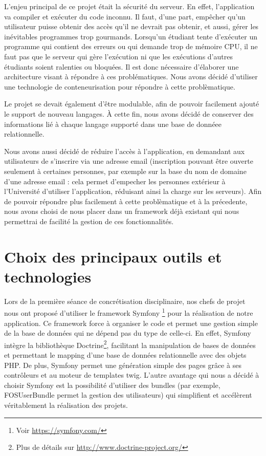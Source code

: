 \par L'enjeu principal de ce projet était la sécurité du serveur. En effet, l'application va compiler et exécuter du code inconnu. Il faut, d'une part, empêcher qu'un utilisateur puisse obtenir des accès qu'il ne devrait pas obtenir, et aussi, gérer les inévitables programmes trop gourmands. Lorsqu'un étudiant tente d'exécuter un programme qui contient des erreurs ou qui demande trop de mémoire CPU, il ne faut pas que le serveur qui gère l'exécution ni que les exécutions d'autres étudiants soient ralenties ou bloquées. Il est donc nécessaire d'élaborer une architecture visant à répondre à ces problématiques. Nous avons décidé d'utiliser une technologie de conteneurisation pour répondre à cette problèmatique.

\par Le projet se devait également d'être modulable, afin de pouvoir facilement ajouté le support de nouveau langages. À cette fin, nous avons décidé de conserver des informations lié à chaque langage supporté dans une base de donnéee relationnelle.

\par Nous avons aussi décidé de réduire l'accès à l'application, en demandant aux utilisateurs de s'inscrire via une adresse email (inscription pouvant être ouverte seulement à certaines personnes, par exemple sur la base du nom de domaine d'une adresse email : cela permet d'empecher les personnes extérieur à l'Université d'utiliser l'application, réduisant ainsi la charge sur les serveurs). Afin de pouvoir répondre plus facilement à cette problèmatique et à la précedente, nous avons choisi de nous placer dans un framework déjà existant qui nous permettrai de facilité la gestion de ces fonctionnalités.

\section{Choix des principaux outils et technologies}
\label{sec-principaux-outils}
\par Lors de la première séance de concrétisation disciplinaire, nos chefs de projet nous ont proposé d'utiliser le framework Symfony \footnote{Voir \url{https://symfony.com/}} pour la réalisation de notre application. Ce framework force à organiser le code et permet une gestion simple de la base de données qui ne dépend pas du type de celle-ci. En effet, Symfony intègre la bibliothèque Doctrine\footnote{Plus de détails sur \url{http://www.doctrine-project.org/}}, facilitant la manipulation de bases de données et permettant le mapping d'une base de données relationnelle avec des objets PHP. De plus, Symfony permet une génération simple des pages grâce à ses contrôleurs et au moteur de templates twig. L'autre avantage qui nous a décidé à choisir Symfony est la possibilité d'utiliser des bundles (par exemple, FOSUserBundle permet la gestion des utilisateurs) qui simplifient et accélèrent véritablement la réalisation des projets. \\

